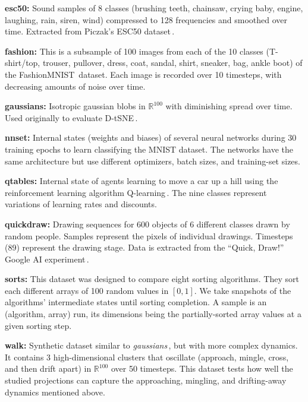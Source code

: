 \noindent \textbf{esc50:} Sound samples of 8 classes (brushing teeth, chainsaw, crying baby, engine, laughing, rain, siren, wind) compressed to 128 frequencies and smoothed over time. Extracted from Piczak's ESC50 dataset\,\cite{dataset:esc50}.

\noindent \textbf{fashion:} This is a subsample of 100 images from each of the 10 classes (T-shirt/top, trouser, pullover, dress, coat, sandal, shirt, sneaker, bag, ankle boot) of the FashionMNIST\,\cite{dataset:Xiao2017} dataset. Each image is recorded over 10 timesteps, with decreasing amounts of noise over time.

\noindent \textbf{gaussians:} Isotropic gaussian blobs in $\mathbb{R}^{100}$ with diminishing spread over time. Used originally to evaluate D-tSNE\,\cite{Rauber2016}.

\noindent \textbf{nnset:} Internal states (weights and biases) of several neural networks during 30 training epochs to learn classifying the MNIST dataset. The networks have the same architecture but use different optimizers, batch sizes, and training-set sizes.

\noindent \textbf{qtables:} Internal state of agents learning to move a car up a hill using the reinforcement learning algorithm Q-learning\,\cite{qlearning}. The nine classes represent variations of learning rates and discounts.

\noindent \textbf{quickdraw:} Drawing sequences for 600 objects of 6 different classes drawn by random people. Samples represent the pixels of individual drawings. Timesteps (89) represent the drawing stage. Data is extracted from the ``Quick, Draw!'' Google AI experiment\,\cite{dataset:quickdraw}.

\noindent \textbf{sorts:} This dataset was designed to compare eight sorting algorithms. They sort each different arrays of 100 random values in $[0,1]$. 
We take snapshots of the algorithms' intermediate states until sorting completion. A sample is an (algorithm, array) run, its dimensions being the partially-sorted array values at a given sorting step.

\noindent \textbf{walk:} Synthetic dataset similar to \emph{gaussians}\,\cite{Rauber2016}, but with more complex dynamics. It contains 3 high-dimensional clusters that oscillate (approach, mingle, cross, and then drift apart) in $\mathbb{R}^{100}$ over 50 timesteps. This dataset tests how well the studied projections can capture the approaching, mingling, and drifting-away dynamics mentioned above.

